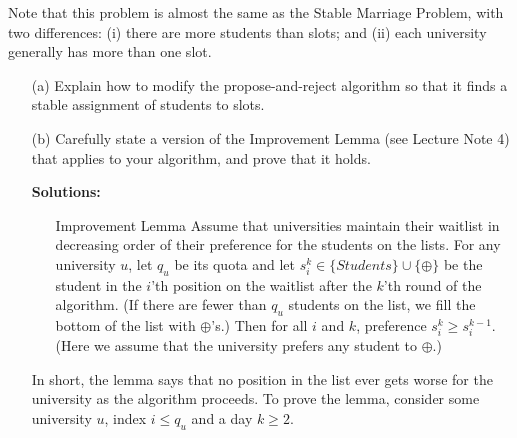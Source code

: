 \documentclass[11pt]{article}
\newif\ifsolutions
\renewcommand{\answer}[1]{{\color{mydarkblue}\textbf{Solutions: }#1}}
\begin{document}
\begin{qunlist}
Note that this problem is almost the same as the Stable Marriage Problem, with two differences:
(i) there are more students than slots; and
(ii) each university generally has more than one slot.
\begin{itemize}
\item[(a)] Explain how to modify the propose-and-reject algorithm so that 
it finds a stable assignment of students to slots.

\ifsolutions
\answer{
We will extend the propose-and-reject algorithm given in the lecture notes.
Students will play the role of men and universities will play the role of women.
Instead of keeping a single person as in the original algorithm, 
each university will keep a \textit{waitlist} of size equal to its quota.
The extended procedure works as follows:
\begin{itemize}
\item All students apply to their first-choice university.
\item Each university $u$ with a quota of $q_u$, then places on its waitlist
the $q_u$ applicants who rank highest
(or all the applicants if there are fewer than $q_u$ of them) and rejects all the rest.
\item Rejected applicants then apply to their second-choice university, 
and again each university $u$ selects the top $q_u$ students 
from among the new applicants AND those on its waitlist;
it puts the selected students on its new waitlist, and rejects the rest of its applicants
(including those who were previously on its waitlist but now are not).
\item The above procedure is repeated until every applicant is either on a waitlist 
or has been rejected by every university.
At this point, each university admits everyone on its waitlist. 
\end{itemize}
}
\fi


\item[(b)] Carefully state a version of the Improvement Lemma (see Lecture Note 4) 
that applies to your algorithm, and prove that it holds.

\ifsolutions
\answer{
\begin{itemize}
\item[Improvement Lemma] Assume that universities maintain their waitlist in decreasing order of
their preference for the students on the lists.
For any university $u$, let $q_u$ be its quota and let $s_i^k \in \{Students\}\cup\{\oplus\}$
be the student in the $i$'th position on the waitlist after the $k$'th round of the algorithm.
(If there are fewer than $q_u$ students on the list, we fill the bottom of the list with $\oplus$'s.)
Then for all $i$ and $k$, preference $s_i^k \geq s_i^{k-1}$. 
(Here we assume that the university prefers any student to $\oplus$.)
\end{itemize}
In short, the lemma says that no position in the list ever gets worse for the university 
as the algorithm proceeds.
To prove the lemma, consider some university $u$, index $i \leq q_u$ and a day $k \geq 2$.

}
\end{itemize}
\end{qunlist}
\end{document}
